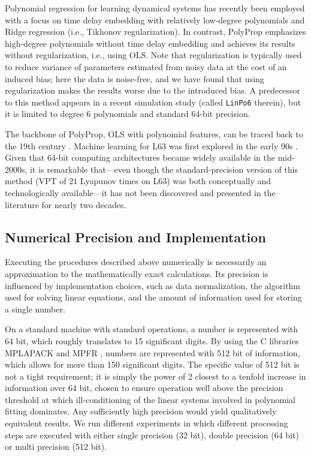 \documentclass{article}
\begin{document}
Polynomial regression for learning dynamical systems has recently been employed \citep{Gauthier2021} with a focus on time delay embedding with relatively low-degree polynomials and Ridge regression (i.e., Tikhonov regularization). In contrast, PolyProp emphasizes high-degree polynomials without time delay embedding and achieves its results without regularization, i.e., using OLS. Note that regularization is typically used to reduce variance of parameters estimated from noisy data at the cost of an induced bias; here the data is noise-free, and we have found that using regularization makes the results worse due to the introduced bias. A predecessor to this method appears in a recent simulation study \citep{Schotz2025} (called \texttt{LinPo6} therein), but it is limited to degree $6$ polynomials and standard 64-bit precision.

The backbone of PolyProp, OLS with polynomial features, can be traced back to the 19th century \citep{Gergonne1815,Stigler1974}. Machine learning for L63 was first explored in the early 90s \citep{Elsner1992}.
Given that 64-bit computing architectures became widely available in the mid-2000s, it is remarkable that---even though the standard-precision version of this method (VPT of $21$ Lyapunov times on L63) was both conceptually and technologically available---it has not been discovered and presented in the literature for nearly two decades.
%
%
%
\subsection{Numerical Precision and Implementation}\label{ssec:numerics}
%
Executing the procedures described above numerically is necessarily an approximation to the mathematically exact calculations. Its precision is influenced by implementation choices, such as data normalization, the algorithm used for solving linear equations, and the amount of information used for storing a single number. 

On a standard machine with standard operations, a number is represented with 64 bit, which roughly translates to 15 significant digits. By using the C libraries MPLAPACK \citep{mplapack} and MPFR \citep{mpfr}, numbers are represented with 512 bit of information, which allows for more than 150 significant digits. The specific value of 512 bit is not a tight requirement; it is simply the power of 2 closest to a tenfold increase in information over 64 bit, chosen to ensure operation well above the precision threshold at which ill-conditioning of the linear systems involved in polynomial fitting dominates. Any sufficiently high precision would yield qualitatively equivalent results. We run different experiments in which different processing steps are executed with either single precision (32 bit), double precision (64 bit) or multi precision (512 bit).
\end{document}
